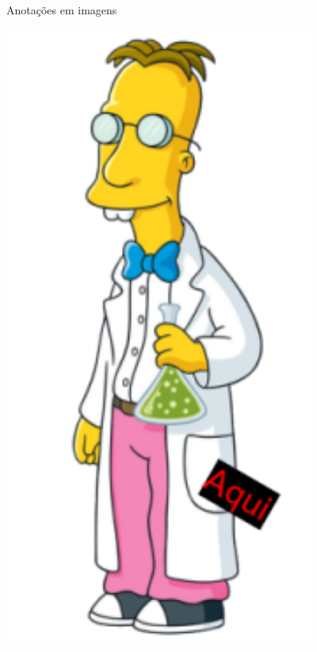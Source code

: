 \documentclass[
  ignorenonframetext,
]{beamer}
\begin{document}
\begin{frame}{Anotações em imagens}
\protect\hypertarget{anotauxe7uxf5es-em-imagens-1}{}

\includegraphics[width=4.0in]{frink_anot}

\begin{center}
\tiny{}
\end{center}

\end{frame}
\end{document}
